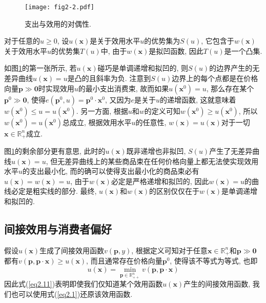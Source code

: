 \documentclass[cn, 12pt, math=mtpro2, bibstyle=apa, blue, twocol]{elegantbook}
\newcommand{\R}{\mathbb{R}}
\newcommand{\p}{\mathbf{p}}
\newcommand{\x}{\mathbf{x}}
\begin{document}
\begin{figure}[htbp!]
  \centering
  \texttt{[image: fig2-2.pdf]}
  \caption{支出与效用的对偶性.}\label{fig2.2}
\end{figure}

对于任意的$u\ge0$, 设$u(\x)$是关于效用水平$u$的优势集为$S(u)$, 它包含于$w(\x)$关于效用水平$u$的优势集$T(u)$中, 由于$w(\x)$是拟凹函数, 因此$T(u)$是一个凸集.

如图\ref{fig2.2}的第一张所示, 若$u(\x)$碰巧是单调递增和拟凹的, 则$S(u)$的边界产生的无差异曲线$u(\x)=u$是凸的且斜率为负. 注意到$S(u)$边界上的每个点都是在价格向量$\p\gg\mathbf{0}$时实现效用$u$的最小支出消费束, 故而如果$u(\x^0)=u$, 那么存在某个$\p^0\gg\mathbf{0}$, 使得$e(\p^0,u)=\p^0\cdot\x^0$, 又因为$e$是关于$u$的递增函数, 这就意味着$w(\x^0)\leq u=u(\x^0)$. 另一方面, 根据$u$和$w$的定义可知$w(\x^0)\ge u(\x^0)$, 所以$w(\x^0)=u(\x^0)$总成立, 根据效用水平$u$的任意性, $w(\x)=u(\x)$对于一切$\x\in\R_+^n$成立.

图\ref{fig2.2}的剩余部分更有意思, 此时的$u(\x)$既非递增也非拟凹, $S(u)$产生了无差异曲线$u(\x)=u$, 但无差异曲线上的某些商品束在任何价格向量上都无法使实现效用水平$u$的支出最小化, 而的确可以使得支出最小化的商品束必有$u(\x)=w(\x)=u$, 由于$w(\x)$必定是严格递增和拟凹的, 因此$w(\x)=u$的曲线必定是粗实线的部分. 最终, $u(\x)$和$w(\x)$的区别仅仅在于$w(\x)$是单调递增和拟凹的.
\subsection{间接效用与消费者偏好}
假设$u(\x)$生成了间接效用函数$v(\p,y)$, 根据定义可知对于任意$\x\in\R_+^n$和$\p\gg\mathbf{0}$都有$v(\p,\p\cdot\x)\ge u(\x)$, 而且通常存在价格向量$\p^0$, 使得该不等式为等式, 也即
\begin{equation}\label{eq2.11}
  u(\x)=\min_{\p\in\R_{++}^n}v(\p,\p\cdot\x)
\end{equation}
因此式(\ref{eq2.11})表明即使我们仅知道某个效用函数$u(\x)$产生的间接效用函数, 我们也可以使用式(\ref{eq2.1})还原该效用函数.
\end{document}
